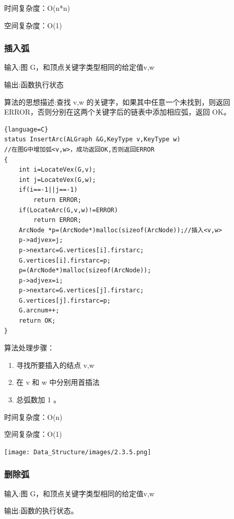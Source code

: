 \documentclass[supercite]{Experimental_Report}
\theoremstyle{definition}
\begin{document}
时间复杂度：O(n*n)

空间复杂度：O(1)

\subsubsection{插入弧}
输入:图 G，和顶点关键字类型相同的给定值v,w

输出:函数执行状态

算法的思想描述:查找 v,w 的关键字，如果其中任意一个未找到，则返回 ERROR，否则分别在这两个关键字后的链表中添加相应弧，返回 OK。	
\begin{lstlisting}{language=C}
status InsertArc(ALGraph &G,KeyType v,KeyType w)
//在图G中增加弧<v,w>，成功返回OK,否则返回ERROR
{
    int i=LocateVex(G,v);
    int j=LocateVex(G,w);
    if(i==-1||j==-1) 
        return ERROR;
    if(LocateArc(G,v,w)!=ERROR) 
        return ERROR;
    ArcNode *p=(ArcNode*)malloc(sizeof(ArcNode));//插入<v,w>
    p->adjvex=j;
    p->nextarc=G.vertices[i].firstarc;
    G.vertices[i].firstarc=p;
    p=(ArcNode*)malloc(sizeof(ArcNode));
    p->adjvex=i;
    p->nextarc=G.vertices[j].firstarc;
    G.vertices[j].firstarc=p;
    G.arcnum++;
    return OK;
}
\end{lstlisting}
算法处理步骤：
\begin{enumerate}
	\renewcommand{\labelenumi}{\theenumi)}
	\item 寻找所要插入的结点 v,w
	\item 在 v 和 w 中分别用首插法
	\item 总弧数加 1 。
\end{enumerate}

时间复杂度：O(n)

空间复杂度：O(1)


\texttt{[image: Data\_Structure/images/2.3.5.png]}
\vspace{-0.2cm}
\subsubsection{删除弧}

输入:图 G，和顶点关键字类型相同的给定值v,w

输出:函数的执行状态。
\end{document}
